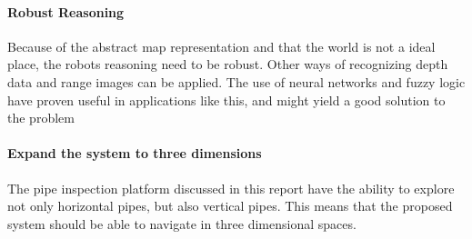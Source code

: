 \paragraph{Robust Reasoning} Because of the abstract map representation and that the world
is not a ideal place, the robots reasoning need to be robust. Other ways of recognizing
depth data and range images can be applied. The use of neural networks and fuzzy logic
have proven useful in applications like this, and might yield a good solution to the
problem

\paragraph{Expand the system to three dimensions} The pipe inspection platform discussed in this report
have the ability to explore not only horizontal pipes, but also vertical pipes. This means
that the proposed system should be able to navigate in three dimensional spaces. 

